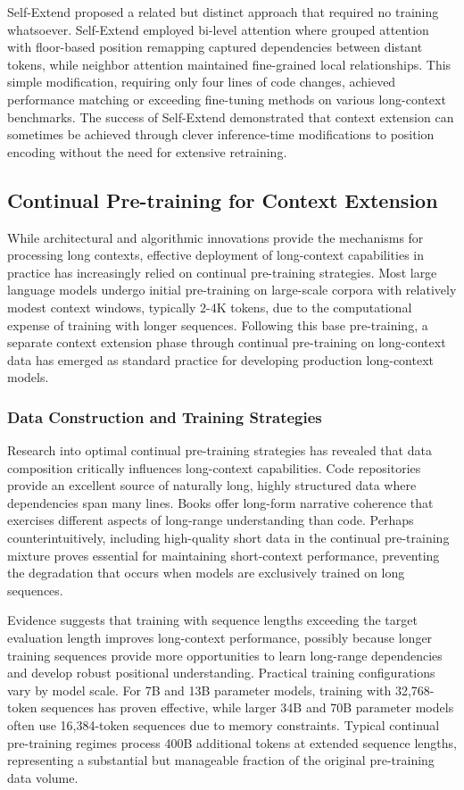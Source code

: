 \documentclass[11pt,letterpaper]{article}
\begin{document}
Self-Extend \cite{jin2024llm} proposed a related but distinct approach that required no training whatsoever. Self-Extend employed bi-level attention where grouped attention with floor-based position remapping captured dependencies between distant tokens, while neighbor attention maintained fine-grained local relationships. This simple modification, requiring only four lines of code changes, achieved performance matching or exceeding fine-tuning methods on various long-context benchmarks. The success of Self-Extend demonstrated that context extension can sometimes be achieved through clever inference-time modifications to position encoding without the need for extensive retraining.

\subsection{Continual Pre-training for Context Extension}

While architectural and algorithmic innovations provide the mechanisms for processing long contexts, effective deployment of long-context capabilities in practice has increasingly relied on continual pre-training strategies. Most large language models undergo initial pre-training on large-scale corpora with relatively modest context windows, typically 2-4K tokens, due to the computational expense of training with longer sequences. Following this base pre-training, a separate context extension phase through continual pre-training on long-context data has emerged as standard practice for developing production long-context models.

\subsubsection{Data Construction and Training Strategies}

Research into optimal continual pre-training strategies has revealed that data composition critically influences long-context capabilities. Code repositories provide an excellent source of naturally long, highly structured data where dependencies span many lines. Books offer long-form narrative coherence that exercises different aspects of long-range understanding than code. Perhaps counterintuitively, including high-quality short data in the continual pre-training mixture proves essential for maintaining short-context performance, preventing the degradation that occurs when models are exclusively trained on long sequences.

Evidence suggests that training with sequence lengths exceeding the target evaluation length improves long-context performance, possibly because longer training sequences provide more opportunities to learn long-range dependencies and develop robust positional understanding. Practical training configurations vary by model scale. For 7B and 13B parameter models, training with 32,768-token sequences has proven effective, while larger 34B and 70B parameter models often use 16,384-token sequences due to memory constraints. Typical continual pre-training regimes process 400B additional tokens at extended sequence lengths, representing a substantial but manageable fraction of the original pre-training data volume.
\end{document}
